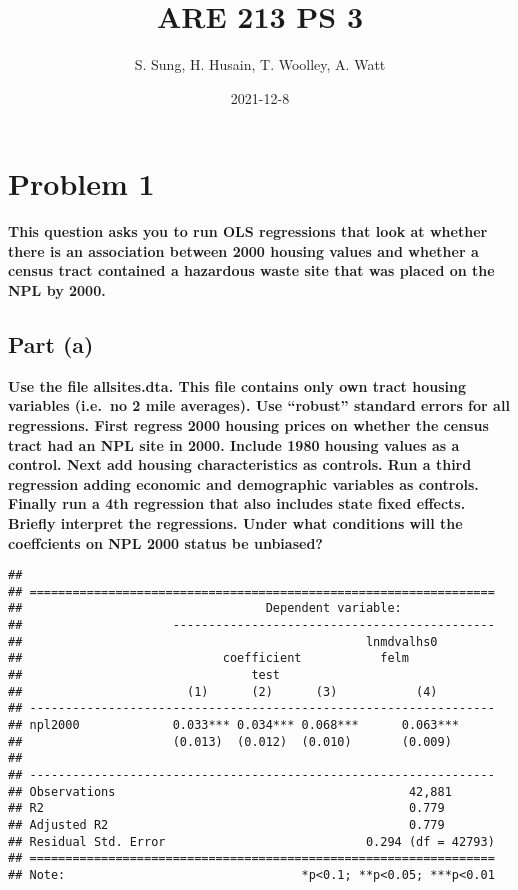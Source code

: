 \documentclass[
]{article}
\title{ARE 213 PS 3}
\author{S. Sung, H. Husain, T. Woolley, A. Watt}
\date{2021-12-8}
\begin{document}
\maketitle

\newpage

\hypertarget{problem-1}{%
\section{Problem 1}\label{problem-1}}

\textbf{This question asks you to run OLS regressions that look at
whether there is an association between 2000 housing values and whether
a census tract contained a hazardous waste site that was placed on the
NPL by 2000.}

\hypertarget{part-a}{%
\subsection{Part (a)}\label{part-a}}

\textbf{Use the file allsites.dta. This file contains only own tract
housing variables (i.e.~no 2 mile averages). Use ``robust'' standard
errors for all regressions. First regress 2000 housing prices on whether
the census tract had an NPL site in 2000. Include 1980 housing values as
a control. Next add housing characteristics as controls. Run a third
regression adding economic and demographic variables as controls.
Finally run a 4th regression that also includes state fixed effects.
Briefly interpret the regressions. Under what conditions will the
coeffcients on NPL 2000 status be unbiased?}

\begin{verbatim}
## 
## =================================================================
##                                  Dependent variable:             
##                     ---------------------------------------------
##                                                lnmdvalhs0
##                            coefficient           felm  
##                                test                    
##                       (1)      (2)      (3)           (4)        
## -----------------------------------------------------------------
## npl2000             0.033*** 0.034*** 0.068***      0.063***     
##                     (0.013)  (0.012)  (0.010)       (0.009)      
##                                                                  
## -----------------------------------------------------------------
## Observations                                         42,881      
## R2                                                   0.779       
## Adjusted R2                                          0.779       
## Residual Std. Error                            0.294 (df = 42793)
## =================================================================
## Note:                                 *p<0.1; **p<0.05; ***p<0.01
\end{verbatim}
\end{document}
